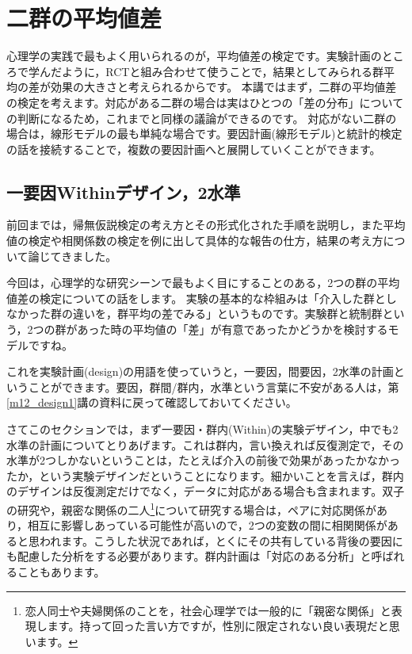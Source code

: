 \documentclass{ltjsbook}
\begin{document}
\chapter{二群の平均値差}
\label{m20_ttest}

心理学の実践で最もよく用いられるのが，平均値差の検定です。実験計画のところで学んだように，RCTと組み合わせて使うことで，結果としてみられる群平均の差が効果の大きさと考えられるからです。
本講ではまず，二群の平均値差の検定を考えます。対応がある二群の場合は実はひとつの「差の分布」についての判断になるため，これまでと同様の議論ができるのです。
対応がない二群の場合は，線形モデルの最も単純な場合です。要因計画(線形モデル)と統計的検定の話を接続することで，複数の要因計画へと展開していくことができます。

\section{一要因Withinデザイン，2水準}
前回までは，帰無仮説検定の考え方とその形式化された手順を説明し，また平均値の検定や相関係数の検定を例に出して具体的な報告の仕方，結果の考え方について論じてきました。

今回は，心理学的な研究シーンで最もよく目にすることのある，2つの群の平均値差の検定についての話をします。
実験の基本的な枠組みは「介入した群としなかった群の違いを，群平均の差でみる」というものです。実験群と統制群という，2つの群があった時の平均値の「差」が有意であったかどうかを検討するモデルですね。

これを実験計画(design)の用語を使っていうと，一要因，間要因，2水準の計画ということができます。要因，群間/群内，水準という言葉に不安がある人は，第\ref{m12_design1}講の資料に戻って確認しておいてください。

さてこのセクションでは，まず一要因・群内(Within)の実験デザイン，中でも2水準の計画についてとりあげます。これは群内，言い換えれば反復測定で，その水準が2つしかないということは，たとえば介入の前後で効果があったかなかったか，という実験デザインだということになります。細かいことを言えば，群内のデザインは反復測定だけでなく，データに対応がある場合も含まれます。双子の研究や，親密な関係の二人\footnote{恋人同士や夫婦関係のことを，社会心理学では一般的に「親密な関係」と表現します。持って回った言い方ですが，性別に限定されない良い表現だと思います。}について研究する場合は，ペアに対応関係があり，相互に影響しあっている可能性が高いので，2つの変数の間に相関関係があると思われます。こうした状況であれば，とくにその共有している背後の要因にも配慮した分析をする必要があります。群内計画は「対応のある分析」と呼ばれることもあります。
\end{document}

